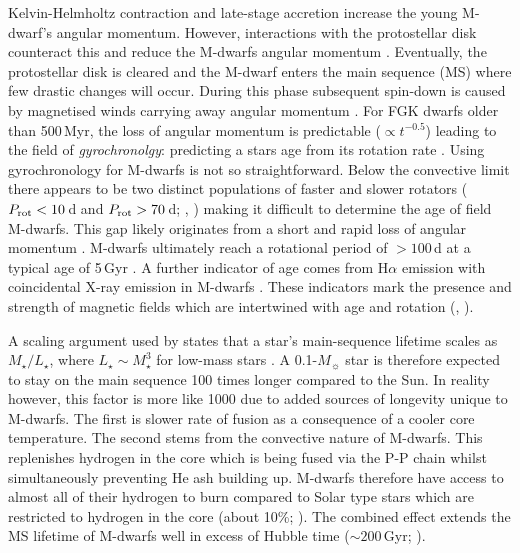 Kelvin-Helmholtz contraction and late-stage accretion increase the young M-dwarf's angular momentum. However, interactions with the protostellar disk counteract this and reduce the M-dwarfs angular momentum \citep{2005ApJ...632L.135M}.  Eventually, the protostellar  disk is cleared and the M-dwarf enters the main sequence (MS) where few drastic changes will occur. During this phase subsequent spin-down is caused by magnetised winds carrying away angular momentum \citep{2003ApJ...586..464B}. For FGK dwarfs older than 500\,Myr, the loss of angular momentum is predictable ($\propto t^{-0.5}$) leading to the field of \textit{gyrochronolgy}: predicting a stars age from its rotation rate \citep{2008ApJ...687.1264M}. Using gyrochronology for M-dwarfs is not so straightforward. Below the convective limit there appears to be two distinct populations of faster and slower rotators ($P_{\rm rot} < 10$\,d and $P_{\rm rot} > 70$\,d; \citealt{2011ApJ...727...56I}, \citealt{2016ApJ...821...93N}) making it difficult to determine the age of field M-dwarfs. This gap likely originates from a short and rapid loss of angular momentum \citep{2011ApJ...727...56I}. M-dwarfs ultimately reach a rotational period of $> 100$\,d at a typical age of 5\,Gyr \citep{2016ApJ...821...93N}. A further indicator of age comes from H$\alpha$ emission with coincidental X-ray emission in M-dwarfs \citep{2007AJ....134.2398C}. These indicators mark the presence and strength of magnetic fields which are intertwined with age and rotation (\citealt{2006AJ....132.2507W}, \citealt{2008AJ....135..785W}).



A scaling argument used by \citet{2016PhR...663....1S} states that a star's main-sequence lifetime scales as $M_\star / L_\star$, where $L_\star \sim M_\star^3$ for low-mass stars \citep{2009itss.book.....P}. A 0.1-$M_\sun$ star is therefore expected to stay on the main sequence 100 times longer compared to the Sun. In reality however, this factor is more like 1000 due to added sources of longevity unique to M-dwarfs. The first is slower rate of fusion as a consequence of a cooler core temperature. The second stems from the convective nature of M-dwarfs. This replenishes hydrogen in the core which is being fused via the P-P chain whilst simultaneously preventing He ash building up. M-dwarfs therefore have access to almost all of their hydrogen to burn \citep{2004RMxAC..22...46A} compared to Solar type stars which are restricted to hydrogen in the core (about 10\%; \citealt{2016PhR...663....1S}). The combined effect extends the MS lifetime of M-dwarfs well in excess of Hubble time ($\sim 200$\,Gyr; \citealt{1998A&A...337..403B}).
\fi


